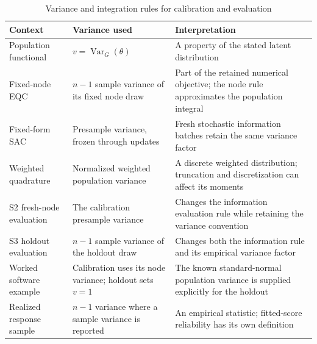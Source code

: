 \begin{table}[htbp]\centering
\caption{Variance and integration rules for calibration and evaluation}\label{tab:estimand-conventions}
{\footnotesize\begin{tabular}{>{\raggedright\arraybackslash}p{}>{\raggedright\arraybackslash}p{}>{\raggedright\arraybackslash}p{}}
\toprule
Context & Variance used & Interpretation \\
\midrule
Population functional & $v=\operatorname{Var}_G(\theta)$ & A property of the stated latent distribution \\
Fixed-node EQC & $n-1$ sample variance of its fixed node draw & Part of the retained numerical objective; the node rule approximates the population integral \\
Fixed-form SAC & Presample variance, frozen through updates & Fresh stochastic information batches retain the same variance factor \\
Weighted quadrature & Normalized weighted population variance & A discrete weighted distribution; truncation and discretization can affect its moments \\
S2 fresh-node evaluation & The calibration presample variance & Changes the information evaluation rule while retaining the variance convention \\
S3 holdout evaluation & $n-1$ sample variance of the holdout draw & Changes both the information rule and its empirical variance factor \\
Worked software example & Calibration uses its node variance; holdout sets $v=1$ & The known standard-normal population variance is supplied explicitly for the holdout \\
Realized response sample & $n-1$ variance where a sample variance is reported & An empirical statistic; fitted-score reliability has its own definition \\
\bottomrule\end{tabular}}
\end{table}
